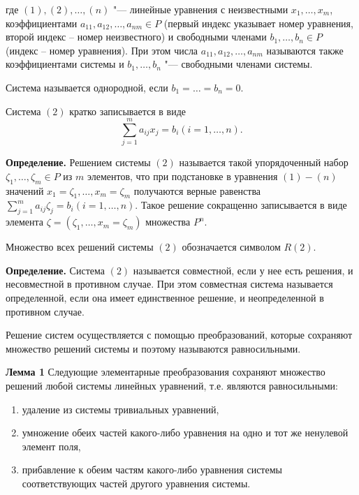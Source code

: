 \documentclass[bachelor, och, labwork]{SCWorks}
\begin{document}
        где $(1), (2), \dots, (n)$ "--- линейные уравнения с неизвестными $x_1,
        \dots, x_m$, коэффициентами $a_{11}, a_{12}, \dots, a_{nm} \in P$
        (первый индекс указывает номер уравнения, второй индекс – номер
        неизвестного) и свободными членами $b_1, \dots, b_n \in P$ (индекс –
        номер уравнения). При этом числа $a_{11}, a_{12}, \dots, a_{nm}$
        называются также коэффициентами системы и $b_1, \dots, b_n$ "---
        свободными членами системы.

        Система называется однородной, если $b_1 = \dots = b_n = 0$. 
        
        Система $(2)$ кратко записывается в виде $$\sum_{j = 1}^{m} a_{ij}
        x_j = b_i (i = 1, \dots, n).$$

        \textbf{Определение.} Решением системы $(2)$ называется такой упорядоченный набор $\zeta_1,
        \dots, \zeta_m \in P$ из $m$ элементов, что при подстановке в уравнения
        $(1)-(n)$ значений $x_1 = \zeta_1, \dots, x_m = \zeta_m$ получаются
        верные равенства $\sum_{j = 1}^{m} a_{ij} \zeta_j = b_i (i = 1, \dots,
        n)$. Такое решение сокращенно записывается в виде элемента $\zeta =
        (\zeta_1, \dots, x_m = \zeta_m)$ множества $P^{n}$.

        Множество всех решений системы $(2)$ обозначается символом $R(2)$.

        \textbf{Определение.} Система $(2)$ называется совместной, если у
        нее есть решения, и несовместной в противном случае. При этом
        совместная система называется определенной, если она имеет единственное
        решение, и неопределенной в противном случае.

        Решение систем осуществляется с помощью преобразований, которые сохраняют
        множество решений системы и поэтому называются равносильными.

        \textbf{Лемма 1} Следующие элементарные преобразования сохраняют множество
        решений любой системы линейных уравнений, т.е. являются равносильными:
        \begin{enumerate}
            \item удаление из системы тривиальных уравнений,
            \item умножение обеих частей какого-либо уравнения на одно и тот же ненулевой элемент поля,
            \item прибавление к обеим частям какого-либо уравнения системы соответствующих частей другого 
            уравнения системы.
        \end{enumerate}
\end{document}
